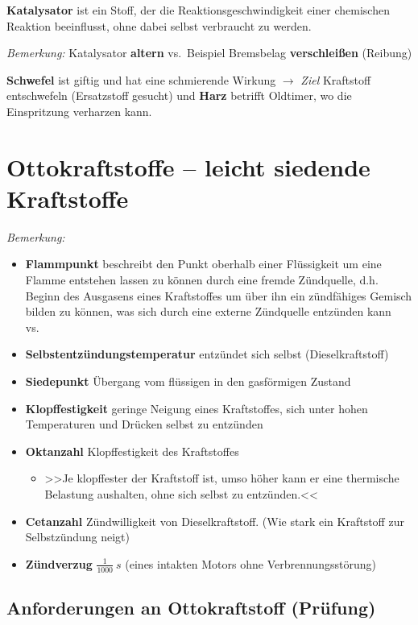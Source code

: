 \textbf{Katalysator} ist ein Stoff, der die Reaktionsgeschwindigkeit
einer chemischen Reaktion beeinflusst, ohne dabei selbst verbraucht zu
werden.

\emph{Bemerkung:} Katalysator \textbf{altern} vs.~Beispiel Bremsbelag
\textbf{verschleißen} (Reibung)

\textbf{Schwefel} ist giftig und hat eine schmierende Wirkung $\to$
\emph{Ziel} Kraftstoff entschwefeln (Ersatzstoff gesucht) und
\textbf{Harz} betrifft Oldtimer, wo die Einspritzung verharzen kann.

\section{Ottokraftstoffe -- leicht siedende
Kraftstoffe}\label{ottokraftstoffe-leicht-siedende-kraftstoffe}

\emph{Bemerkung:}

\begin{itemize}
\item
  \textbf{Flammpunkt} beschreibt den Punkt oberhalb einer Flüssigkeit um
  eine Flamme entstehen lassen zu können durch eine fremde Zündquelle,
  d.h. Beginn des Ausgasens eines Kraftstoffes um über ihn ein
  zündfähiges Gemisch bilden zu können, was sich durch eine externe
  Zündquelle entzünden kann vs.~
\item
  \textbf{Selbstentzündungstemperatur} entzündet sich selbst
  (Dieselkraftstoff)
\item
  \textbf{Siedepunkt} Übergang vom flüssigen in den gasförmigen Zustand
\item
  \textbf{Klopffestigkeit} geringe Neigung eines Kraftstoffes, sich
  unter hohen Temperaturen und Drücken selbst zu entzünden
\item
  \textbf{Oktanzahl} Klopffestigkeit des Kraftstoffes

  \begin{itemize}
  \item
    >>Je klopffester der Kraftstoff ist, umso höher kann er eine
    thermische Belastung aushalten, ohne sich selbst zu entzünden.<<
  \end{itemize}
\item
  \textbf{Cetanzahl} Zündwilligkeit von Dieselkraftstoff. (Wie stark ein
  Kraftstoff zur Selbstzündung neigt)
\item
  \textbf{Zündverzug} $\frac{1}{1000}~s$ (eines intakten Motors ohne
  Verbrennungsstörung)
\end{itemize}

\subsection{Anforderungen an Ottokraftstoff
(Prüfung)}\label{anforderungen-an-ottokraftstoff-pruefung}

